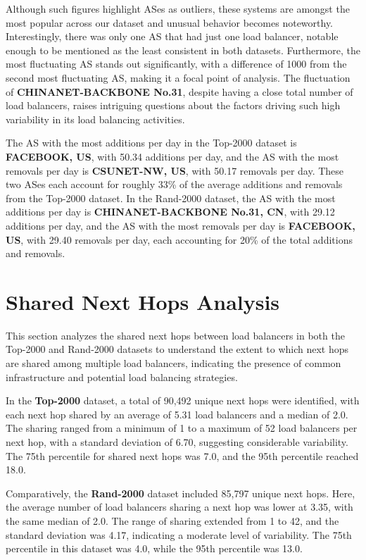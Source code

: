 \documentclass[12pt]{cwru_thesis}
\begin{document}
Although such figures highlight ASes as outliers, these systems are amongst the most popular across our dataset and unusual behavior becomes noteworthy. Interestingly, there was only one AS that had just one load balancer, notable enough to be mentioned as the least consistent in both datasets. Furthermore, the most fluctuating AS stands out significantly, with a difference of 1000 from the second most fluctuating AS, making it a focal point of analysis. The fluctuation of \textbf{CHINANET-BACKBONE No.31}, despite having a close total number of load balancers, raises intriguing questions about the factors driving such high variability in its load balancing activities.

The AS with the most additions per day in the Top-2000 dataset is \textbf{FACEBOOK, US}, with 50.34 additions per day, and the AS with the most removals per day is \textbf{CSUNET-NW, US}, with 50.17 removals per day. These two ASes each account for roughly 33\% of the average additions and removals from the Top-2000 dataset. In the Rand-2000 dataset, the AS with the most additions per day is \textbf{CHINANET-BACKBONE No.31, CN}, with 29.12 additions per day, and the AS with the most removals per day is \textbf{FACEBOOK, US}, with 29.40 removals per day, each accounting for 20\% of the total additions and removals.


\newpage



\section{Shared Next Hops Analysis}

This section analyzes the shared next hops between load balancers in both the Top-2000 and Rand-2000 datasets to understand the extent to which next hops are shared among multiple load balancers, indicating the presence of common infrastructure and potential load balancing strategies.

In the \textbf{Top-2000} dataset, a total of 90,492 unique next hops were identified, with each next hop shared by an average of 5.31 load balancers and a median of 2.0. The sharing ranged from a minimum of 1 to a maximum of 52 load balancers per next hop, with a standard deviation of 6.70, suggesting considerable variability. The 75th percentile for shared next hops was 7.0, and the 95th percentile reached 18.0.

Comparatively, the \textbf{Rand-2000} dataset included 85,797 unique next hops. Here, the average number of load balancers sharing a next hop was lower at 3.35, with the same median of 2.0. The range of sharing extended from 1 to 42, and the standard deviation was 4.17, indicating a moderate level of variability. The 75th percentile in this dataset was 4.0, while the 95th percentile was 13.0.
\end{document}

